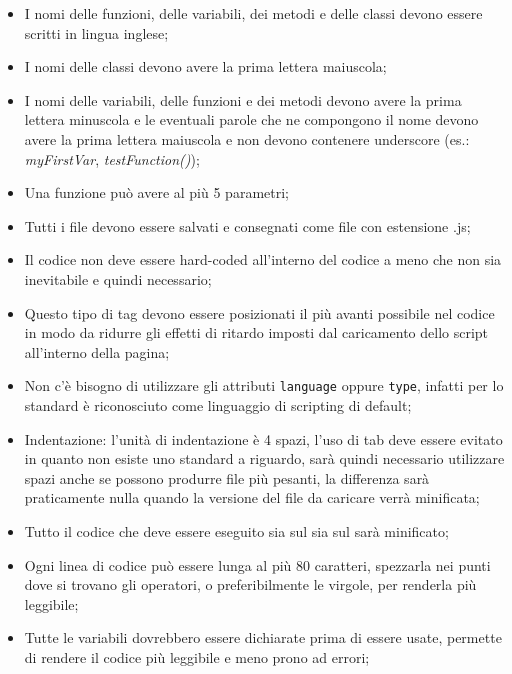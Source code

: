 \label{normeStilisticheCodice}
\begin{itemize}
\item I nomi delle funzioni, delle variabili, dei metodi e delle classi devono essere scritti in lingua inglese;
\item I nomi delle classi devono avere la prima lettera maiuscola;
\item I nomi delle variabili, delle funzioni e dei metodi devono avere la prima lettera minuscola e le eventuali parole che ne compongono il nome devono avere la prima lettera maiuscola e non devono contenere underscore (es.: \textit{myFirstVar}, \textit{testFunction()});
\item Una funzione può avere al più 5 parametri;
\item Tutti i file  devono essere salvati e consegnati come file con estensione .js;
\item Il codice  non deve essere hard-coded all'interno del codice  a meno che non sia inevitabile e quindi necessario;
\item Questo tipo di tag devono essere posizionati il più avanti possibile nel codice  in modo da ridurre gli effetti di ritardo imposti dal caricamento dello script all'interno della pagina;
\item Non c'è bisogno di utilizzare gli attributi \texttt{language} oppure \texttt{type}, infatti per lo standard   è riconosciuto come linguaggio di scripting di default;
\item Indentazione: l'unità di indentazione è 4 spazi, l'uso di tab deve essere evitato in quanto non esiste uno standard a riguardo, sarà quindi necessario utilizzare spazi anche se possono produrre file più pesanti, la differenza sarà praticamente nulla quando la versione del file da caricare verrà minificata;
\item Tutto il codice che deve essere eseguito sia sul  sia sul  sarà minificato;
\item Ogni linea di codice può essere lunga al più 80 caratteri, spezzarla nei punti dove si trovano gli operatori, o preferibilmente le virgole, per renderla più leggibile;
\item Tutte le variabili dovrebbero essere dichiarate prima di essere usate, permette di rendere il codice più leggibile e meno prono ad errori;

\end{itemize}
